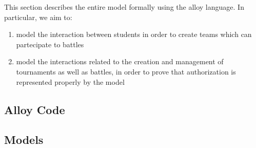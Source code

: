 This section describes the entire model formally using the alloy language. 
In particular, we aim to:
\begin{enumerate}
    \item model the interaction between students
          in order to create teams which can partecipate to battles
    \item model the interactions related to the creation and management
          of tournaments as well as battles, in order to prove that 
          authorization is represented properly by the model
\end{enumerate}

\subsection{Alloy Code}


\pagebreak
\subsection{Models}

